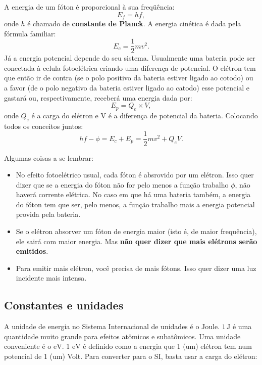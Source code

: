\documentclass{article}
\begin{document}
A energia de um f\'oton \'e proporcional \`a sua freq\"u\^encia:
\begin{equation}
E_f = hf,
\end{equation}
onde $h$ \'e chamado de \textbf{constante de Planck}. A energia cin\'etica \'e dada pela f\'ormula familiar:
\begin{equation}
E_c = \frac{1}{2}mv^2.
\end{equation}
J\'a a energia potencial depende do seu sistema. Usualmente uma bateria pode ser conectada \`a celula fotoel\'etrica criando uma diferen\c ca de potencial. O el\'etron tem que ent\~ao ir de contra (se o polo positivo da bateria estiver ligado ao cotodo) ou a favor (de o polo negativo da bateria estiver ligado ao catodo) esse potencial e gastar\'a ou, respectivamente, receber\'a uma energia dada por:
\begin{equation}
E_p = Q_e\times V,
\end{equation}
onde $Q_e$ \'e a carga do el\'etron e V \'e a diferen\c ca de potencial da bateria. Colocando todos os conceitos juntos:
\begin{equation}\label{eq:energia}
hf - \phi = E_c + E_p = \frac{1}{2}mv^2 + Q_eV.
\end{equation}

Algumas coisas a se lembrar:
\begin{itemize}
\item No efeito fotoel\'etrico usual, cada f\'oton \'e absrovido por um el\'etron. Isso quer dizer que se a energia do f\'oton n\~ao for pelo menos a fun\c c\~ao trabalho $\phi$, n\~ao haver\'a corrente el\'etrica. No caso em que h\'a uma bateria tamb\'em, a energia do f\'oton tem que ser, pelo menos, a fun\c c\~ao trabalho mais a energia potencial provida pela bateria.
\item Se o el\'etron absorver um f\'oton de energia maior (isto \'e, de maior frequ\^encia), ele sair\'a com maior energia. Mas \textbf{n\~ao quer dizer que mais el\'etrons ser\~ao emitidos}.
\item Para emitir mais el\'etron, voc\^e precisa de mais f\'otons. Isso quer dizer uma luz incidente mais intensa.
\end{itemize}

\subsection{Constantes e unidades}

A unidade de energia no Sistema Internacional de unidades \'e o Joule. $1\,\text{J}$ \'e uma quantidade muito grande para efeitos at\^omicos e subat\^omicos. Uma unidade conveniente \'e o $\text{eV}$. 1 $\text{eV}$ \'e definido como a energia que 1 (um) el\'etron tem num potencial de 1 (um) Volt. Para converter para o SI, basta usar a carga do el\'etron:
\end{document}
